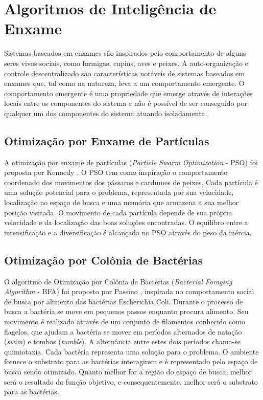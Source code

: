\section{Algoritmos de Inteligência de Enxame}
\label{sec:swarm_intelligence_algorithms}
Sistemas baseados em enxames são inspirados pelo comportamento de alguns seres vivos sociais, como formigas, cupins, aves e peixes. A auto-organização e controle descentralizado são características notáveis de sistemas baseados em enxames que, tal como na natureza, leva a um comportamento emergente. O comportamento emergente é uma propriedade que emerge através de interações locais entre os componentes do sistema e não é possível de ser conseguido por qualquer um dos componentes do sistema atuando isoladamente \cite{garnier2007biological}.

\subsection{Otimização por Enxame de Partículas}
\label{sec:particle_swarm_optimization}
A otimização por enxame de partículas (\textit{Particle Swarm Optimization} - PSO) foi proposta por Kennedy \cite{pso}. O PSO tem como inspiração o comportamento coordenado dos movimentos dos pássaros e cardumes de peixes. Cada partícula é uma solução potencial para o problema, representada por sua velocidade, localização no espaço de busca e uma memória que armazena a sua melhor posição visitada. O movimento de cada partícula depende de sua própria velocidade e da localização das boas soluções encontradas. O equilibro entre a intensificação e a diversificação é alcançada no PSO através do peso da inércia.

\subsection{Otimização por Colônia de Bactérias}
\label{sec:biomimicry_bacterial_foraging}
O algoritmo de Otimização por Colônia de Bactérias (\textit{Bacterial Foraging Algorithm} - BFA) foi proposto por Passino \cite{passino2002biomimicry}, inspirada no comportamento social de busca por alimento das bactérias Escherichia Coli. Durante o processo de busca a bactéria se move em pequenos passos enquanto procura alimento. Seu movimento é realizado através de um conjunto de filamentos conhecido como flagelos, que ajudam a bactéria se mover em períodos alternados de natação (\textit{swim}) e tombos (\textit{tumble}). A alternância entre estes dois períodos chama-se quimiotaxia. Cada bactéria representa uma solução para o problema. O ambiente fornece o substrato para as bactérias interagirem e é representado pelo espaço de busca sendo otimizado. Quanto melhor for a região do espaço de busca, melhor será o resultado da função objetivo, e consequentemente, melhor será o substrato para as bactérias.

